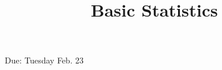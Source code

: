 \documentclass[a4, 12pt]{article}
\title{Basic Statistics}
\author{}
\date{}
\begin{document}
\maketitle

Due: Tuesday Feb. 23
\end{document}
